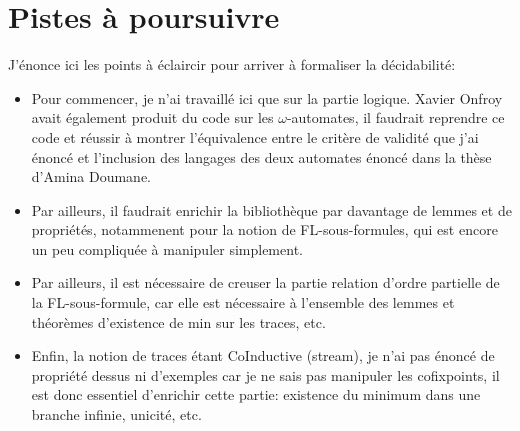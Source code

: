 \documentclass[12pt]{article}
\theoremstyle{break}
\begin{document}
\section{Pistes à poursuivre}
J'énonce ici les points à éclaircir pour arriver à formaliser la décidabilité:
\begin{itemize}
\item Pour commencer, je n'ai travaillé ici que sur la partie logique. Xavier Onfroy avait également produit du code sur les $\omega$-automates, 
	il faudrait reprendre ce code et réussir à montrer l'équivalence entre le critère de validité que j'ai énoncé et l'inclusion des langages des
	deux automates énoncé dans la thèse d'Amina Doumane.
\item Par ailleurs, il faudrait enrichir la bibliothèque par davantage de lemmes et de propriétés, notammenent pour la notion de FL-sous-formules,
	qui est encore un peu compliquée à manipuler simplement.
\item Par ailleurs, il est nécessaire de creuser la partie relation d'ordre partielle de la FL-sous-formule, car elle est nécessaire à l'ensemble des
	lemmes et théorèmes d'existence de min sur les traces, etc. 
\item Enfin, la notion de traces étant CoInductive (stream), je n'ai pas énoncé de propriété dessus ni d'exemples car je ne sais pas manipuler les 
	cofixpoints, il est donc essentiel d'enrichir cette partie: existence du minimum dans une branche infinie, unicité, etc.
\end{itemize}
\end{document}
